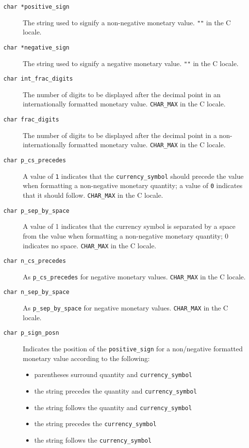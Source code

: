 \begin{description}
   \item[\texttt{char *positive\_sign}] The string used to signify a non-negative monetary value.
    \texttt{""} in the C locale.

   \item[\texttt{char *negative\_sign}] The string used to signify a negative monetary value.  \texttt{""}
    in the C locale.

   \item[\texttt{char int\_frac\_digits}] The number of digits to be displayed  after  the  decimal
    point  in  an  internationally  formatted monetary value.
    \texttt{CHAR\_MAX} in the C locale.

   \item[\texttt{char frac\_digits}] The number of digits to be displayed  after  the  decimal
    point  in a non-internationally formatted monetary value.
    \texttt{CHAR\_MAX} in the C locale.

   \item[\texttt{char p\_cs\_precedes}] A value of \texttt{1} indicates that the
    \texttt{currency\_symbol} should precede the value when formatting a
    non-negative monetary quantity; a value of \texttt{0} indicates that it
    should follow.  \texttt{CHAR\_MAX} in the C locale.

   \item[\texttt{char p\_sep\_by\_space}] A value of  1  indicates  that  the  currency  symbol  is
    separated  by  a  space  from the value when formatting a
    non-negative monetary quantity;  0  indicates  no  space.
    \texttt{CHAR\_MAX} in the C locale.

  \item[\texttt{char n\_cs\_precedes}]
    As \texttt{p\_cs\_precedes} for negative monetary  values.
    \texttt{CHAR\_MAX} in the C locale.

  \item[\texttt{\small char n\_sep\_by\_space}]
    As \texttt{\small p\_sep\_by\_space} for negative monetary values.
    \texttt{CHAR\_MAX} in the C locale.

   \item[\texttt{char p\_sign\_posn}] 
    Indicates the position of the \texttt{positive\_sign}  for  a
     non\-/negative   formatted  monetary  value  according  to  the
     following:


    \begin{itemize}
     \item parentheses surround quantity and \texttt{currency\_symbol}
     \item the string precedes the quantity and \texttt{currency\_symbol}
     \item the string follows the quantity and \texttt{currency\_symbol}
     \item the string precedes the \texttt{currency\_symbol}
     \item the string follows the \texttt{currency\_symbol}
    \end{itemize}


\end{description}
